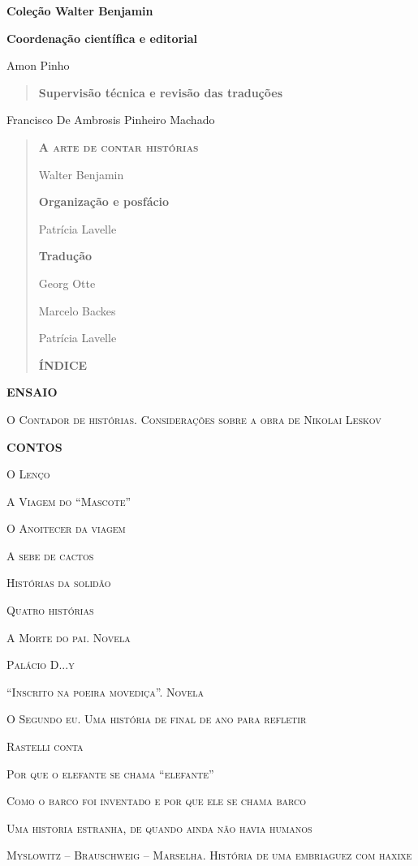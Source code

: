 \textbf{Coleção Walter Benjamin}

\textbf{Coordenação científica e editorial }

Amon Pinho

\begin{quote}
\textbf{Supervisão técnica e revisão das traduções}
\end{quote}

Francisco De Ambrosis Pinheiro Machado

\begin{quote}
\textbf{\textsc{A arte de contar histórias}}

Walter Benjamin

\textbf{Organização e posfácio}

Patrícia Lavelle

\textbf{Tradução }

Georg Otte

Marcelo Backes

Patrícia Lavelle

\textbf{ÍNDICE}
\end{quote}

\textbf{ENSAIO}

\textsc{O Contador de histórias. Considerações sobre a obra de Nikolai
Leskov}

\textbf{CONTOS}

\textsc{O Lenço }

\textsc{A Viagem do ``Mascote''}

\textsc{O Anoitecer da viagem}

\textsc{A sebe de cactos}

\textsc{Histórias da solidão}

\textsc{Quatro histórias}

\textsc{A Morte do pai. Novela}

\textsc{Palácio D...y}

\textsc{``Inscrito na poeira movediça''. Novela}

\textsc{O Segundo eu. Uma história de final de ano para refletir}

\textsc{Rastelli conta}

\textsc{Por que o elefante se chama ``elefante''}

\textsc{Como o barco foi inventado e por que ele se chama barco}

\textsc{Uma historia estranha, de quando ainda não havia humanos}

\textsc{Myslowitz -- Brauschweig -- Marselha. História de uma embriaguez
com haxixe}

